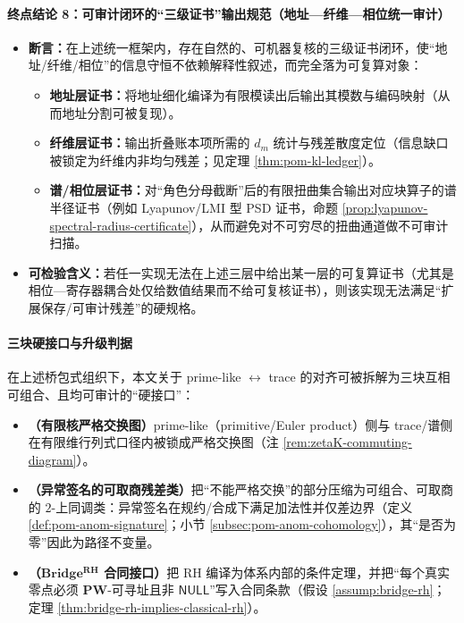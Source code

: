 \paragraph{终点结论 8：可审计闭环的“三级证书”输出规范（地址—纤维—相位统一审计）}
\begin{itemize}
  \item \textbf{断言：}在上述统一框架内，存在自然的、可机器复核的三级证书闭环，使“地址/纤维/相位”的信息守恒不依赖解释性叙述，而完全落为可复算对象：
  \begin{itemize}
    \item \textbf{地址层证书：}将地址细化编译为有限模读出后输出其模数与编码映射（从而地址分割可被复现）。
    \item \textbf{纤维层证书：}输出折叠账本项所需的 \(d_m\) 统计与残差散度定位（信息缺口被锁定为纤维内非均匀残差；见定理 \ref{thm:pom-kl-ledger}）。
    \item \textbf{谱/相位层证书：}对“角色分母截断”后的有限扭曲集合输出对应块算子的谱半径证书（例如 Lyapunov/LMI 型 PSD 证书，命题 \ref{prop:lyapunov-spectral-radius-certificate}），从而避免对不可穷尽的扭曲通道做不可审计扫描。
  \end{itemize}
  \item \textbf{可检验含义：}若任一实现无法在上述三层中给出某一层的可复算证书（尤其是相位—寄存器耦合处仅给数值结果而不给可复核证书），则该实现无法满足“扩展保存/可审计残差”的硬规格。
\end{itemize}

\paragraph{三块硬接口与升级判据}
在上述桥包式组织下，本文关于 prime-like \(\leftrightarrow\) trace 的对齐可被拆解为三块互相可组合、且均可审计的“硬接口”：
\begin{itemize}
  \item \textbf{（有限核严格交换图）}prime-like（primitive/Euler product）侧与 trace/谱侧在有限维行列式口径内被锁成严格交换图（注 \ref{rem:zetaK-commuting-diagram}）。
  \item \textbf{（异常签名的可取商残差类）}把“不能严格交换”的部分压缩为可组合、可取商的 \(2\)-上同调类：异常签名在规约/合成下满足加法性并仅差边界（定义 \ref{def:pom-anom-signature}；小节 \ref{subsec:pom-anom-cohomology}），其“是否为零”因此为路径不变量。
  \item \textbf{（\texorpdfstring{$\mathbf{Bridge^{RH}}$}{BridgeRH} 合同接口）}把 RH 编译为体系内部的条件定理，并把“每个真实零点必须 \(\mathbf{PW}\)-可寻址且非 \(\mathsf{NULL}\)”写入合同条款（假设 \ref{assump:bridge-rh}；定理 \ref{thm:bridge-rh-implies-classical-rh}）。
\end{itemize}
\par
